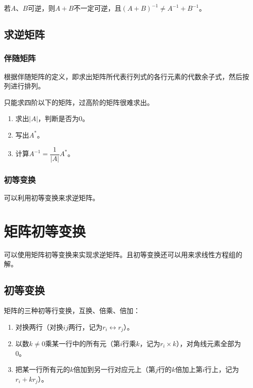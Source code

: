 \documentclass[UTF8, 12pt]{ctexart}
\begin{document}
若$A$、$B$可逆，则$A+B$不一定可逆，且$(A+B)^{-1}\neq A^{-1}+B^{-1}$。

\subsection{求逆矩阵}

\subsubsection{伴随矩阵}

根据伴随矩阵的定义，即求出矩阵所代表行列式的各行元素的代数余子式，然后按列进行排列。

只能求四阶以下的矩阵，过高阶的矩阵很难求出。

\begin{enumerate}
    \item 求出$\vert A\vert$，判断是否为0。
    \item 写出$A^*$。
    \item 计算$A^{-1}=\dfrac{1}{\vert A\vert}A^*$。
\end{enumerate}

\subsubsection{初等变换}

可以利用初等变换来求逆矩阵。

\section{矩阵初等变换}

可以使用矩阵初等变换来实现求逆矩阵。且初等变换还可以用来求线性方程组的解。

\subsection{初等变换}

矩阵的三种初等行变换，互换、倍乘、倍加：

\begin{enumerate}
    \item 对换两行（对换$ij$两行，记为$r_i\leftrightarrow r_j$）。
    \item 以数$k\neq0$乘某一行中的所有元（第$i$行乘$k$，记为$r_i\times k$），对角线元素全部为0。
    \item 把某一行所有元的$k$倍加到另一行对应元上（第$j$行的$k$倍加上第$i$行上，记为$r_i+kr_j$）。
\end{enumerate}
\end{document}
